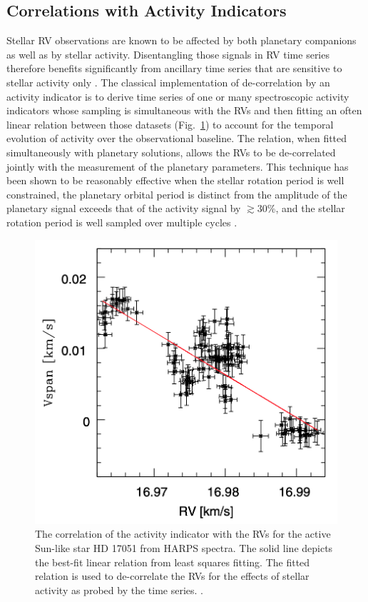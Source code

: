 \subsection{Correlations with Activity Indicators} \label{sect:indicators}
Stellar RV observations are known to be affected by both planetary companions as
well as by stellar activity. Disentangling those signals in RV time series
therefore benefits significantly from ancillary time series that are sensitive
to stellar activity only \citep{boisse09}.
The classical implementation of de-correlation by
an activity indicator is to derive time series of one or many spectroscopic
activity indicators whose sampling is simultaneous with the RVs and then
fitting an often linear relation between those datasets (Fig.~\ref{fig:corr}) to
account for the temporal evolution of activity over the observational baseline.
The relation, when fitted simultaneously with planetary solutions, allows the RVs
to be de-correlated jointly with the measurement of the planetary parameters.
This technique has been shown to be reasonably effective when the stellar rotation period
\prot{} is well constrained, the planetary orbital period is distinct from
\prot{,} the amplitude of the planetary signal exceeds that of the activity signal
by $\gtrsim 30$\%, and the stellar rotation period is well sampled over multiple
cycles \citep{boisse11}. \\

\begin{figure}
  \centering
  \includegraphics[width=.6\textwidth]{figures/vspan_rv.png}
  \caption[Correlation between stellar RVs and the \vspan{} activity indicator.]
      {The correlation of the \vspan{} activity indicator with the RVs for the
    active Sun-like star HD 17051 from HARPS spectra. The solid line depicts the
    best-fit linear relation from least squares fitting. The fitted relation is
    used to de-correlate the RVs for the effects of stellar activity as probed by
    the \vspan{} time series. \citep[Image credit:][]{boisse11}.}
  \label{fig:corr}
\end{figure}

